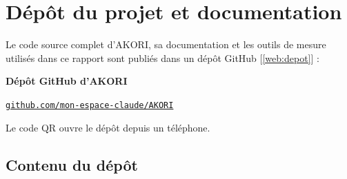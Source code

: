 \documentclass[12pt,a4paper,oneside]{report}
\newcommand{\webref}[1]{[\ref{web:#1}]}
\begin{document}
\appendix
{}

\chapter{Dépôt du projet et documentation}\label{annexe:depot}

Le code source complet d'AKORI, sa documentation et les outils de mesure utilisés dans ce rapport sont publiés dans un dépôt GitHub \webref{depot} :

\begin{center}
\begin{minipage}[c]{3.4cm}
  \centering{}
\end{minipage}\hspace{1.2cm}%
\begin{minipage}[c]{8.5cm}
  \textbf{Dépôt GitHub d'AKORI}\par\smallskip
  \href{https://github.com/mon-espace-claude/AKORI}{\texttt{github.com/mon-espace-claude/AKORI}}\par\smallskip
  {\small Le code QR ouvre le dépôt depuis un téléphone.}
\end{minipage}
\end{center}

\section{Contenu du dépôt}
\end{document}

